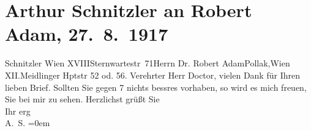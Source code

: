 

         
         \renewcommand{\erwaehntePersonen}{Personen: Robert Adam}
         \renewcommand{\erwaehnteOrte}{Orte: Meidlinger Hauptstraße, Sternwartestraße, VIII., Josefstadt, Wien, XII., Meidling, XVIII., Währing}
         \renewcommand{\erwaehnteWerke}{}
               \section[Arthur Schnitzler an Robert Adam, 27. 8. 1917]{ Arthur Schnitzler an Robert Adam, 27. 8. 1917}\nopagebreak{}\rehead{ }\begin{ledgroupsized}[t]{13cm}\normalsize\beginnumbering \toendnotes[C]{\smallbreak\pagebreak[2]} 
\toendnotes[C]{\smallbreak}\pstart{}{\pb}Schnitzler Wien
                            XVIII\pend{}\pstart{}Sternwartestr 71\pend{}{\bigskip}\pstart{}Herrn Dr. Robert Adam\pend{}\pstart{}Pollak,\pend{}\pstart{}Wien XII.\pend{}\pstart{}Meidlinger Hptstr 52 od. 56.\pend{}{\bigskip}\pstart
           \noindent{}{\pb}Verehrter Herr Doctor, vielen Dank für
                    Ihren lieben Brief. Sollten Sie \label{K_L02269_1v}\label{K_L02269_1h} gegen 7 nichts
                    bessres vorhaben, so wird es mich freuen, Sie bei mir zu sehen.\pend
           \pstart
           Herzlichst grüßt Sie{\\[\baselineskip]}Ihr erg{\\[\baselineskip]}\spacefill\mbox{A. S.}\pend
           \leftskip=0em{}
         
         \endnumbering{}\end{ledgroupsized}  \newcommand{\dateiname}{L02269}\newcommand{\titel}{Arthur Schnitzler an Robert Adam, 27. 8. 1917}\newcommand{\editorInnen}{Martin Anton Müller und Gerd-Hermann Susen}
      